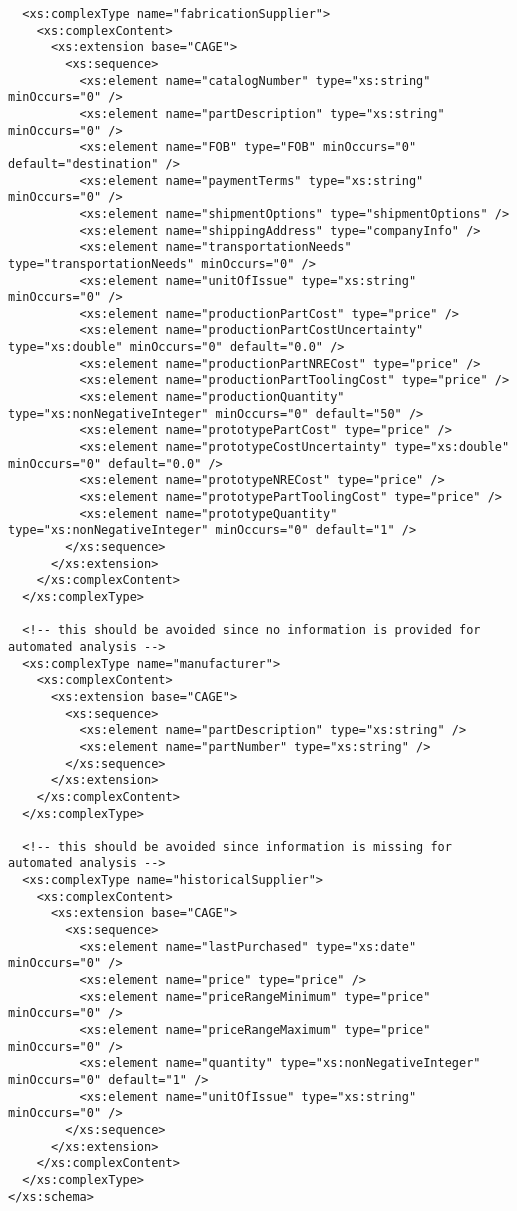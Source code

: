 \begin{lstlisting}
  <xs:complexType name="fabricationSupplier">
    <xs:complexContent>
      <xs:extension base="CAGE">
        <xs:sequence>
          <xs:element name="catalogNumber" type="xs:string" minOccurs="0" />
          <xs:element name="partDescription" type="xs:string" minOccurs="0" />
          <xs:element name="FOB" type="FOB" minOccurs="0" default="destination" />
          <xs:element name="paymentTerms" type="xs:string" minOccurs="0" />
          <xs:element name="shipmentOptions" type="shipmentOptions" />
          <xs:element name="shippingAddress" type="companyInfo" />
          <xs:element name="transportationNeeds" type="transportationNeeds" minOccurs="0" />
          <xs:element name="unitOfIssue" type="xs:string" minOccurs="0" />
          <xs:element name="productionPartCost" type="price" />
          <xs:element name="productionPartCostUncertainty" type="xs:double" minOccurs="0" default="0.0" />
          <xs:element name="productionPartNRECost" type="price" />
          <xs:element name="productionPartToolingCost" type="price" />
          <xs:element name="productionQuantity" type="xs:nonNegativeInteger" minOccurs="0" default="50" />
          <xs:element name="prototypePartCost" type="price" />
          <xs:element name="prototypeCostUncertainty" type="xs:double" minOccurs="0" default="0.0" />
          <xs:element name="prototypeNRECost" type="price" />
          <xs:element name="prototypePartToolingCost" type="price" />
          <xs:element name="prototypeQuantity" type="xs:nonNegativeInteger" minOccurs="0" default="1" />
        </xs:sequence>
      </xs:extension>
    </xs:complexContent>
  </xs:complexType>

  <!-- this should be avoided since no information is provided for automated analysis -->
  <xs:complexType name="manufacturer">
    <xs:complexContent>
      <xs:extension base="CAGE">
        <xs:sequence>
          <xs:element name="partDescription" type="xs:string" />
          <xs:element name="partNumber" type="xs:string" />
        </xs:sequence>
      </xs:extension>
    </xs:complexContent>
  </xs:complexType>

  <!-- this should be avoided since information is missing for automated analysis -->
  <xs:complexType name="historicalSupplier">
    <xs:complexContent>
      <xs:extension base="CAGE">
        <xs:sequence>
          <xs:element name="lastPurchased" type="xs:date" minOccurs="0" />
          <xs:element name="price" type="price" />
          <xs:element name="priceRangeMinimum" type="price" minOccurs="0" />
          <xs:element name="priceRangeMaximum" type="price" minOccurs="0" />
          <xs:element name="quantity" type="xs:nonNegativeInteger" minOccurs="0" default="1" />
          <xs:element name="unitOfIssue" type="xs:string" minOccurs="0" />
        </xs:sequence>
      </xs:extension>
    </xs:complexContent>
  </xs:complexType>
</xs:schema>
\end{lstlisting}

